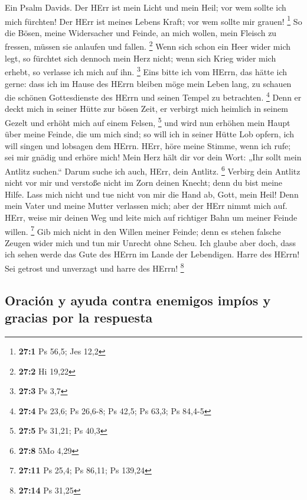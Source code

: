  Ein Psalm Davids. Der HErr ist mein Licht und mein Heil;
vor wem sollte ich mich fürchten! Der HErr ist meines Lebens Kraft; vor
wem sollte mir grauen! \footnote{\textbf{27:1} Ps 56,5; Jes 12,2}
 So die Bösen, meine Widersacher und Feinde, an mich
wollen, mein Fleisch zu fressen, müssen sie anlaufen und fallen.
\footnote{\textbf{27:2} Hi 19,22}  Wenn sich schon ein
Heer wider mich legt, so fürchtet sich dennoch mein Herz nicht; wenn
sich Krieg wider mich erhebt, so verlasse ich mich auf ihn. \footnote{\textbf{27:3}
  Ps 3,7}  Eins bitte ich vom HErrn, das hätte ich gerne:
dass ich im Hause des HErrn bleiben möge mein Leben lang, zu schauen die
schönen Gottesdienste des HErrn und seinen Tempel zu betrachten.
\footnote{\textbf{27:4} Ps 23,6; Ps 26,6-8; Ps 42,5; Ps 63,3; Ps 84,4-5}
 Denn er deckt mich in seiner Hütte zur bösen Zeit, er
verbirgt mich heimlich in seinem Gezelt und erhöht mich auf einem
Felsen, \footnote{\textbf{27:5} Ps 31,21; Ps 40,3}  und
wird nun erhöhen mein Haupt über meine Feinde, die um mich sind; so will
ich in seiner Hütte Lob opfern, ich will singen und lobsagen dem HErrn.
 HErr, höre meine Stimme, wenn ich rufe; sei mir gnädig
und erhöre mich!  Mein Herz hält dir vor dein Wort: „Ihr
sollt mein Antlitz suchen.`` Darum suche ich auch, HErr, dein Antlitz.
\footnote{\textbf{27:8} 5Mo 4,29}  Verbirg dein Antlitz
nicht vor mir und verstoße nicht im Zorn deinen Knecht; denn du bist
meine Hilfe. Lass mich nicht und tue nicht von mir die Hand ab, Gott,
mein Heil!  Denn mein Vater und meine Mutter verlassen
mich; aber der HErr nimmt mich auf.  HErr, weise mir
deinen Weg und leite mich auf richtiger Bahn um meiner Feinde willen.
\footnote{\textbf{27:11} Ps 25,4; Ps 86,11; Ps 139,24} 
Gib mich nicht in den Willen meiner Feinde; denn es stehen falsche
Zeugen wider mich und tun mir Unrecht ohne Scheu.  Ich
glaube aber doch, dass ich sehen werde das Gute des HErrn im Lande der
Lebendigen.  Harre des HErrn! Sei getrost und unverzagt
und harre des HErrn! \footnote{\textbf{27:14} Ps 31,25}

\hypertarget{oraciuxf3n-y-ayuda-contra-enemigos-impuxedos-y-gracias-por-la-respuesta}{%
\subsection{Oración y ayuda contra enemigos impíos y gracias por la
respuesta}\label{oraciuxf3n-y-ayuda-contra-enemigos-impuxedos-y-gracias-por-la-respuesta}}

